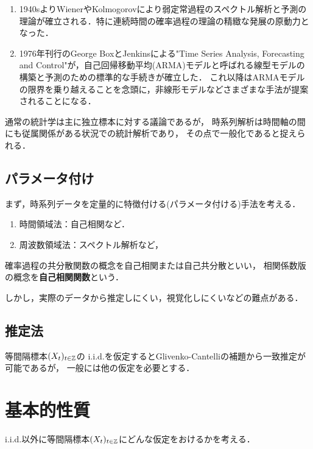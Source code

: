 \documentclass[uplatex,dvipdfmx]{jsreport}
\begin{document}
\begin{enumerate}
    \item 1940sよりWienerやKolmogorovにより弱定常過程のスペクトル解析と予測の理論が確立される．特に連続時間の確率過程の理論の精緻な発展の原動力となった．
    \item 1976年刊行のGeorge BoxとJenkinsによる"Time Series Analysis, Forecasting and Control"が，自己回帰移動平均(ARMA)モデルと呼ばれる線型モデルの構築と予測のための標準的な手続きが確立した．
    これ以降はARMAモデルの限界を乗り越えることを念頭に，非線形モデルなどさまざまな手法が提案されることになる．
\end{enumerate}

通常の統計学は主に独立標本に対する議論であるが，
時系列解析は時間軸の間にも従属関係がある状況での統計解析であり，
その点で一般化であると捉えられる．

\subsection{パラメータ付け}

まず，時系列データを定量的に特徴付ける(パラメータ付ける)手法を考える．
\begin{enumerate}
    \item 時間領域法：自己相関など．
    \item 周波数領域法：スペクトル解析など，
\end{enumerate}

\begin{definition}
    確率過程の共分散関数の概念を自己相関または自己共分散といい，
    相関係数版の概念を\textbf{自己相関関数}という．
\end{definition}
\begin{remark}
    しかし，実際のデータから推定しにくい，視覚化しにくいなどの難点がある．
\end{remark}

\subsection{推定法}

等間隔標本$(X_t)_{t\in\mathbb{Z}}$の
i.i.d.を仮定するとGlivenko-Cantelliの補題から一致推定が可能であるが，
一般には他の仮定を必要とする．

\section{基本的性質}

\begin{tcolorbox}[colframe=ForestGreen, colback=ForestGreen!10!white,breakable,colbacktitle=ForestGreen!40!white,coltitle=black,fonttitle=\bfseries\sffamily,
title=]
    i.i.d.以外に等間隔標本$(X_t)_{t\in\mathbb{Z}}$にどんな仮定をおけるかを考える．
\end{tcolorbox}
\end{document}
